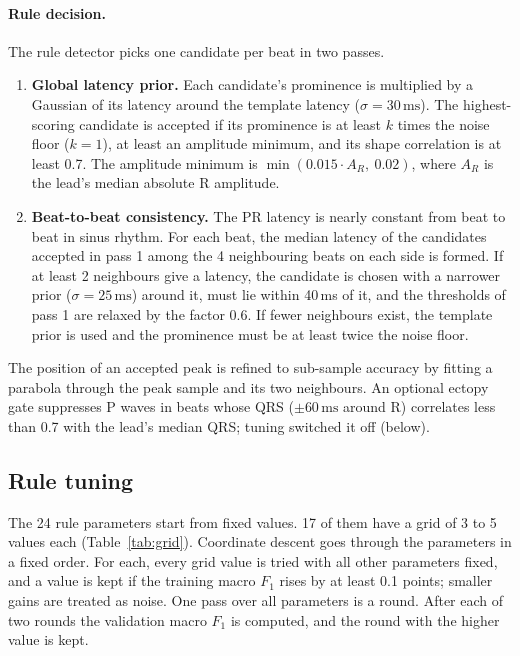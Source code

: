 \documentclass[11pt,a4paper]{article}
\newcommand{\ms}{\,\mathrm{ms}}
\begin{document}
\paragraph{Rule decision.} The rule detector picks one candidate per beat in two passes.
\begin{enumerate}
\item \textbf{Global latency prior.} Each candidate's prominence is multiplied by a Gaussian of its latency around the template latency ($\sigma = 30\ms$). The highest-scoring candidate is accepted if its prominence is at least $k$ times the noise floor ($k = 1$), at least an amplitude minimum, and its shape correlation is at least 0.7. The amplitude minimum is $\min(0.015 \cdot A_R,\ 0.02)$, where $A_R$ is the lead's median absolute R amplitude.
\item \textbf{Beat-to-beat consistency.} The PR latency is nearly constant from beat to beat in sinus rhythm. For each beat, the median latency of the candidates accepted in pass 1 among the 4 neighbouring beats on each side is formed. If at least 2 neighbours give a latency, the candidate is chosen with a narrower prior ($\sigma = 25\ms$) around it, must lie within 40\,ms of it, and the thresholds of pass 1 are relaxed by the factor 0.6. If fewer neighbours exist, the template prior is used and the prominence must be at least twice the noise floor.
\end{enumerate}
The position of an accepted peak is refined to sub-sample accuracy by fitting a parabola through the peak sample and its two neighbours. An optional ectopy gate suppresses P waves in beats whose QRS ($\pm60\ms$ around R) correlates less than 0.7 with the lead's median QRS; tuning switched it off (below).

\subsection{Rule tuning}

The 24 rule parameters start from fixed values. 17 of them have a grid of 3 to 5 values each (Table~\ref{tab:grid}). Coordinate descent goes through the parameters in a fixed order. For each, every grid value is tried with all other parameters fixed, and a value is kept if the training macro $F_1$ rises by at least 0.1 points; smaller gains are treated as noise. One pass over all parameters is a round. After each of two rounds the validation macro $F_1$ is computed, and the round with the higher value is kept.
\end{document}
